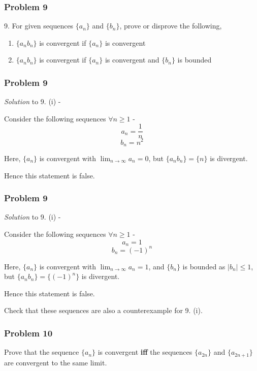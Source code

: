 \documentclass[
	11pt, %
]{beamer}
\begin{document}

\begin{frame}
	\frametitle{Problem 9}
	
	\begin{block}{9.}
		For given sequences $\{a_n\}$ and $\{b_n\}$, prove or disprove the following,
		\begin{enumerate}
			\item $\{a_nb_n\}$ is convergent if $\{a_n\}$ is convergent
			\item $\{a_nb_n\}$ is convergent if $\{a_n\}$ is convergent and $\{b_n\}$ is bounded
		\end{enumerate}

	\end{block}
	
\end{frame}

\begin{frame}[t]
	\frametitle{Problem 9}

	\textit{Solution} to 9. (i) -

	\bigskip

	Consider the following sequences $\forall n \geq 1$ -
	\[a_n = \frac1n\]
	\[b_n = n^2\]

	Here, $\{a_n\}$ is convergent with $\lim _{n \to \infty} a_n = 0$, but $\{a_n b_n\} = \{n\}$ is divergent. 

	\medskip

	Hence this statement is false.
\end{frame}

\begin{frame}[t]
	\frametitle{Problem 9}

	\textit{Solution} to 9. (i) -

	\bigskip

	Consider the following sequences $\forall n \geq 1$ -
	\[a_n = 1\]
	\[b_n = (-1)^n\]

	Here, $\{a_n\}$ is convergent with $\lim _{n \to \infty} a_n = 1$, and $\{b_n\}$ is bounded as $|b_n| \leq 1$, but $\{a_n b_n\} = \{(-1)^n\}$ is divergent. 

	\medskip

	Hence this statement is false.

	\medskip

	Check that these sequences are also a counterexample for 9. (i).
\end{frame}

\begin{frame}
	\frametitle{Problem 10}
	
	\begin{block}{10}
		Prove that the sequence $\{a_n\}$ is convergent \textbf{iff} the sequences $\{a_{2n}\}$ and $\{a_{2n+1}\}$ are convergent to the same limit.
	\end{block}
	
\end{frame}
\end{document}
